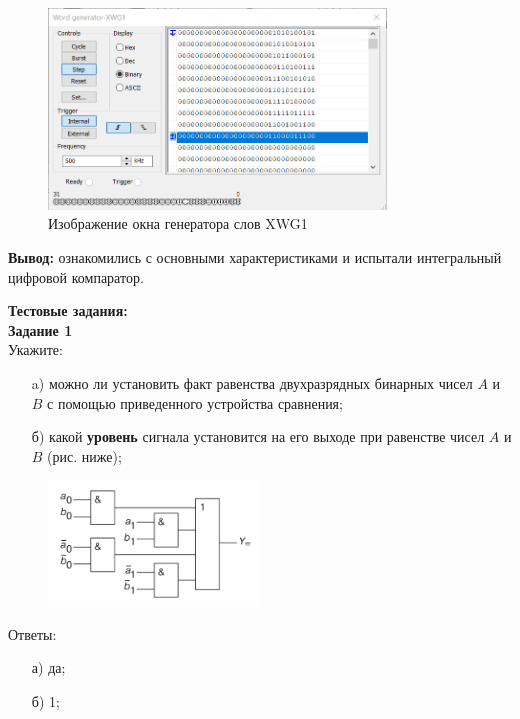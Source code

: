 \documentclass[spec, och, labwork]{shiza}
\begin{document}
\begin{figure}[H]
    \centering
    \includegraphics[width=0.8\textwidth]{pic3/3.png}
    \caption{Изображение окна генератора слов XWG1}
\end{figure}

\textbf{Вывод: } ознакомились с основными характеристиками и испытали интегральный цифровой компаратор.

\textbf{Тестовые задания:}\\

\textbf{Задание 1}\\
    Укажите:
    
    \begin{enumerate}
        \item[a)] можно ли установить факт равенства двухразрядных бинарных чисел $A$ и $B$ с помощью приведенного
        устройства сравнения;

        \item[б)] какой \textbf{уровень} сигнала установится на его выходе при равенстве чисел $A$ и $B$ (рис. ниже);

    \end{enumerate}
    
    \begin{figure}[H]
        \centering
        \includegraphics[width=0.5\textwidth]{pic3/test1.png}
        \caption{}
    \end{figure}

    Ответы:
    \begin{enumerate}
        \item[а)] да;
        \item[б)] 1;
    \end{enumerate}
\end{document}
